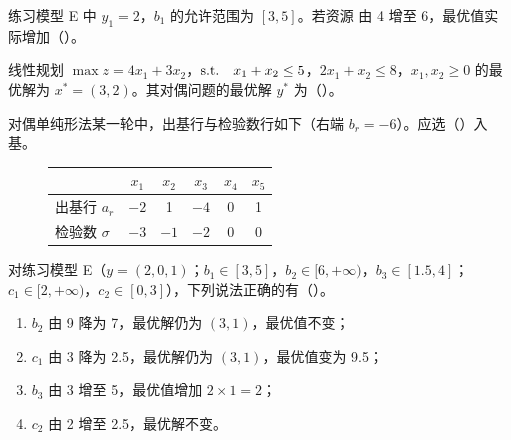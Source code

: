 \noindent{}

\Q[\diff{提升·K5+K7}] 练习模型 E 中 $y_1=2$，$b_1$ 的允许范围为 $[3,5]$。若资源  由 4 增至 6，最优值实际增加（\quad）。
\begin{figure}[!htbp]\centering
{}
\end{figure}

\Q[\diff{提升·K4+K3}] 线性规划 $\max z=4x_1+3x_2$，$\text{s.t.}\quad x_1+x_2\le5$，$2x_1+x_2\le8$，$x_1,x_2\ge0$ 的最优解为 $x^*=(3,2)$。其对偶问题的最优解 $y^*$ 为（\quad）。
\begin{figure}[!htbp]\centering
{}
\end{figure}

\Q[\diff{提升·K6}] 对偶单纯形法某一轮中，出基行与检验数行如下（右端 $b_r=-6$）。应选（\quad）入基。
\begin{figure}[!htbp]\centering
\small
\begin{tabular}{@{}l|ccccc@{}}\toprule
 & $x_1$ & $x_2$ & $x_3$ & $x_4$ & $x_5$\\\midrule
出基行 $a_r$ & $-2$ & 1 & $-4$ & 0 & 1\\
检验数 $\sigma$ & $-3$ & $-1$ & $-2$ & 0 & 0\\\bottomrule
\end{tabular}
\end{figure}

\medskip
{}\noindent{}

\Q[\diff{提升·K5+K7+K8}] 对练习模型 E（$y=(2,0,1)$；$b_1\in[3,5]$，$b_2\in[6,+\infty)$，$b_3\in[1.5,4]$；$c_1\in[2,+\infty)$，$c_2\in[0,3]$），下列说法正确的有（\quad）。
\begin{enumerate}[label=\Alph*.,leftmargin=2em]
  \item $b_2$ 由 9 降为 7，最优解仍为 $(3,1)$，最优值不变；
  \item $c_1$ 由 3 降为 2.5，最优解仍为 $(3,1)$，最优值变为 9.5；
  \item $b_3$ 由 3 增至 5，最优值增加 $2\times1=2$；
  \item $c_2$ 由 2 增至 2.5，最优解不变。
\end{enumerate}

